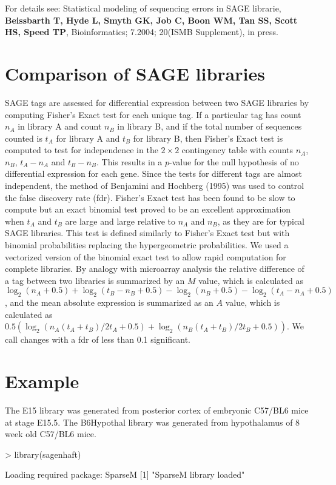 \documentclass[12pt]{article}
\begin{document}
For details see: Statistical modeling of sequencing errors in SAGE librarie,
\textbf{Beissbarth T, Hyde L, Smyth GK, Job C, Boon WM, Tan SS, Scott HS, Speed TP},
Bioinformatics; 7.2004; 20(ISMB Supplement), in press.

\section{Comparison of SAGE libraries}

SAGE tags are assessed for differential expression between two SAGE libraries by
computing Fisher's Exact test for each unique tag. If a particular tag has count
$n_A$ in library A and count $n_B$ in library B, and if the total number of
sequences counted is $t_A$ for library A and $t_B$ for library B, then Fisher's
Exact test is computed to test for independence in the $2 \times 2$ contingency
table with counts $n_A$, $n_B$, $t_A - n_A$ and $t_B - n_B$. This results in a
$p$-value for the null hypothesis of no differential expression for each
gene. Since the tests for different tags are almost independent, the method of
Benjamini and Hochberg (1995) was used to control the false discovery rate
(fdr). Fisher's Exact test has been found to be slow to compute but an exact
binomial test proved to be an excellent approximation when $t_A$ and $t_B$ are
large and large relative to $n_A$ and $n_B$, as they are for typical SAGE
libraries. This test is defined similarly to Fisher's Exact test but with
binomial probabilities replacing the hypergeometric probabilities. We used a
vectorized version of the binomial exact test to allow rapid computation for
complete libraries. By analogy with microarray analysis the relative difference
of a tag between two libraries is summarized by an $M$ value, which is
calculated as
$\log_2(n_A+0.5)+\log_2(t_B-n_B+0.5)-\log_2(n_B+0.5)-\log_2(t_A-n_A+0.5)$, and
the mean absolute expression is summarized as an $A$ value, which is calculated
as $0.5 (\log_2(n_A (t_A+t_B)/2t_A + 0.5) + \log_2(n_B(t_A+t_B)/2t_B +0.5))$. We
call changes with a fdr of less than 0.1 significant.

\section{Example}

The E15 library was generated from posterior cortex of embryonic C57/BL6 mice at
stage E15.5. The B6Hypothal library was generated from hypothalamus of 8 week
old C57/BL6 mice.

\begin{Schunk}
\begin{Sinput}
> library(sagenhaft)
\end{Sinput}
\begin{Soutput}
Loading required package: SparseM 
[1] "SparseM library loaded"
\end{Soutput}
\end{Schunk}
\end{document}
